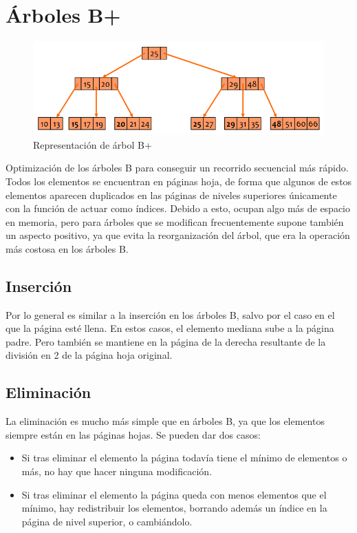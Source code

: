 \documentclass{article}
\begin{document}
\section{Árboles B+}

\begin{figure}
    \centering
    \includegraphics[width=\linewidth]{img-t5/img_683_70.png}
    \caption{Representación de árbol B+}
\end{figure}

Optimización de los árboles B para conseguir un recorrido secuencial más rápido.
Todos los elementos se encuentran en páginas hoja, de forma que algunos de estos elementos
aparecen duplicados en las páginas de niveles superiores únicamente con la función de actuar
como índices. Debido a esto, ocupan algo más de espacio en memoria, pero para árboles que se
modifican frecuentemente supone también un aspecto positivo, ya que evita la reorganización
del árbol, que era la operación más costosa en los árboles B.

\subsection{Inserción}
Por lo general es similar a la inserción en los árboles B, salvo por el caso en el que la página esté llena. En estos casos, el elemento mediana sube a la página padre. Pero también se mantiene en la página de la derecha resultante de la división en 2 de la página hoja original.

\subsection{Eliminación}
La eliminación es mucho más simple que en árboles B, ya que los elementos siempre están en
las páginas hojas. Se pueden dar dos casos:
\begin{itemize}
    \item Si tras eliminar el elemento la página todavía tiene el mínimo de elementos o más, no hay que hacer ninguna modificación.
    \item Si tras eliminar el elemento la página queda con menos elementos que el mínimo, hay redistribuir los elementos, borrando además un índice en la página de nivel superior, o cambiándolo.
\end{itemize}
\end{document}
